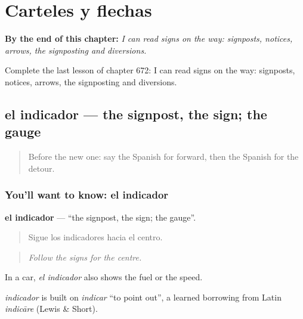 
\chapter{Carteles y flechas}
\label{ch:es-carteles-y-flechas}

\begin{chapteropening}
\textbf{By the end of this chapter:} \emph{I can read signs on the way: signposts, notices, arrows, the signposting and diversions.}

Complete the last lesson of chapter 672: I can read signs on the way: signposts, notices, arrows, the signposting and diversions.
\end{chapteropening}

\section[el indicador]{el indicador — the signpost, the sign; the gauge}

\label{lesson:ES-C672-indicador}



\begin{quote}
Before the new one: say the Spanish for forward, then the Spanish for the detour.
\end{quote}

\subsection*{You'll want to know: el indicador}
\textbf{el indicador} — \textquotedblleft{}the signpost, the sign; the gauge\textquotedblright{}.

\begin{quote}
Sigue los indicadores hacia el centro.
\end{quote}

\begin{quote}
\emph{Follow the signs for the centre.}
\end{quote}

In a car, \emph{el indicador} also shows the fuel or the speed.

\begin{cousinweb}
\emph{indicador} is built on \emph{indicar} \textquotedblleft{}to point out\textquotedblright{}, a learned borrowing from Latin \emph{indicāre} (Lewis \& Short).
\end{cousinweb}

